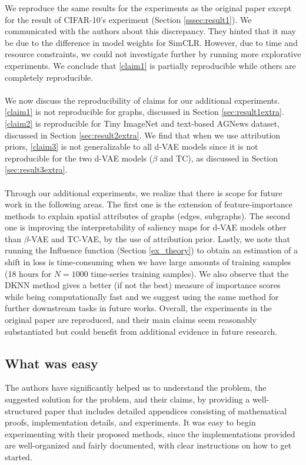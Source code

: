 We reproduce the same results for the  experiments as the original paper except for the result of  CIFAR-10's experiment (Section \ref{sssec:result1}). We communicated with the authors about this discrepancy. They hinted that it may be due to the difference in model weights for SimCLR. However, due to time and resource constraints, we could not investigate further by running more explorative experiments. We conclude that \ref{claim1} is partially reproducible while others are completely reproducible. 
\\
\\
We now discuss the reproducibility of claims for our additional experiments. \ref{claim1} is not reproducible  for graphs, discussed in Section \ref{sec:result1extra}. \ref{claim2} is reproducible for Tiny ImageNet and text-based AGNews dataset, discussed in Section \ref{sec:result2extra}. We find that when we use attribution priors, \ref{claim3} is not generalizable to all d-VAE models since it is not reproducible for the two d-VAE models ($\beta$ and TC), as discussed in Section \ref{sec:result3extra}. 
\\
\\
Through our additional experiments, we realize that there is scope for future work in the following areas. The first one is the extension of feature-importance methods to explain spatial attributes of graphs (edges, subgraphs). The second one is improving the interpretability of saliency maps for d-VAE models other than $\beta$-VAE and TC-VAE, by the use of attribution prior. Lastly, we note that running the Influence function (Section \ref{ex_theory}) to obtain an estimation of a shift in loss is time-consuming when we have large amounts of training samples (18 hours for $N=1000$ time-series training samples). We also observe that the DKNN method gives a better (if not the best) measure of importance scores while being computationally fast and we suggest using the same method for further downstream tasks in future works. 
Overall, the experiments in the original paper are reproduced, and their main claims seem reasonably substantiated but could benefit from additional evidence in future research.



\subsection{What was easy}
The authors have significantly helped us to understand the problem, the suggested solution for the problem, and their claims, by providing a well-structured paper that includes detailed appendices consisting of mathematical proofs, implementation details, and experiments. It was easy to begin experimenting with their proposed methods, since the implementations provided are well-organized and fairly documented,  with clear instructions on how to get started. 

